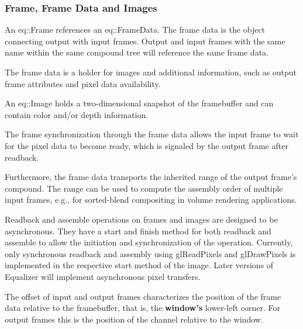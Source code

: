 \documentclass[10pt,a4]{scrartcl}
\begin{document}
\subsubsection{Frame, Frame Data and Images}

An \textsf{eq::Frame} references an \textsf{eq::Fra\-me\-Data}. The
frame data is the object connecting output with input frames. Output and
input frames with the same name within the same compound tree will
reference the same frame data.

The frame data is a holder for images and additional information, such
as output frame attributes and pixel data availability.

An \textsf{eq::Image} holds a
two-dimensional snapshot of the framebuffer and can contain color and/or
depth information.

The frame synchronization through the frame data allows the input frame
to wait for the pixel data to become ready, which is signaled by the
output frame after readback.

Furthermore, the frame data transports the inherited range of the output
frame's compound. The range can be used to compute the assembly order of
multiple input frames, e.g., for sorted-blend compositing in volume
rendering applications.

Readback and assemble operations on frames and images are designed to be
asynchronous. They have a start and finish method for both readback and
assemble to allow the initiation and synchronization of the operation.
Currently, only synchronous readback and assembly using
\textsf{glReadPixels} and \textsf{glDrawPixels} is implemented in the
respective start method of the image. Later versions of Equalizer will
implement asynchronous pixel transfers.

The offset of input and output frames characterizes the position of the
frame data relative to the framebuffer, that is, the \textbf{window's}
lower-left corner. For output frames this is the position of the channel
relative to the window.
\end{document}
